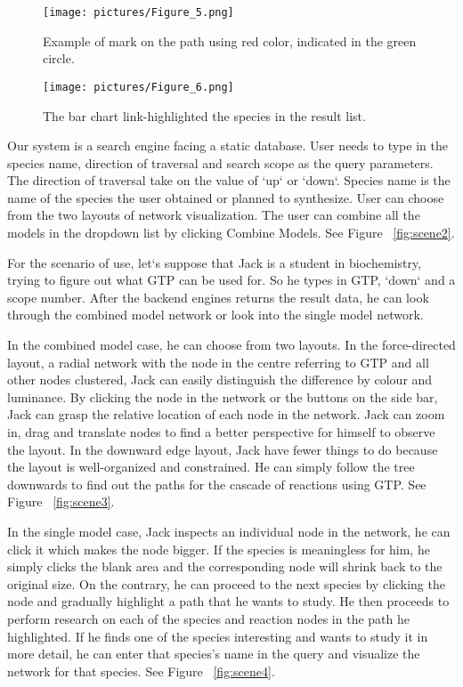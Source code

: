 \documentclass[journal]{vgtc}                %
\begin{document}
\begin{figure}
\texttt{[image: pictures/Figure\_5.png]}
\caption{Example of mark on the path using red color, indicated in the green circle. }
\label{fig:scene5}
\end{figure}

\begin{figure}
\texttt{[image: pictures/Figure\_6.png]}
\caption{The bar chart link-highlighted the species in the result list. }
\label{fig:scene6}
\end{figure}

Our system is a search engine facing a static database. User needs to type in the species name, direction of traversal and search scope as the query parameters. The direction of traversal  take on the value of `up` or `down`. Species name is the name of the species the user obtained or planned to synthesize. User can choose from the two layouts of network visualization. The user can combine all the models in the dropdown list by clicking Combine Models. See Figure ~\ref{fig:scene2}.


For the scenario of use, let`s suppose that Jack is a student in biochemistry, trying to figure out what GTP can be used for. So he types in GTP, `down` and a scope number. After the backend engines returns the result data, he can look through the combined model network or look into the single model network. 



In the combined model case, he can choose from two layouts. In the force-directed layout, a radial network with the node in the centre referring to GTP and all other nodes clustered, Jack can easily distinguish the difference by colour and luminance. By clicking the node in the network or the buttons on the side bar, Jack can grasp the relative location of each node in the network. Jack can zoom in, drag and translate nodes to find a better perspective for himself to observe the layout. In the downward edge layout, Jack have fewer things to do because the layout is well-organized and constrained. He can simply follow the tree downwards to find out the paths for the cascade of reactions using GTP. See Figure ~\ref{fig:scene3}.

In the single model case,  Jack inspects an individual node in the network, he can click it which makes the node bigger. If the species is meaningless for him, he simply clicks the blank area and the corresponding node will shrink back to the original size. On the contrary, he can proceed to the next species by clicking the node and gradually highlight a path that he wants to study. He then proceeds to perform research on each of the species and reaction nodes in the path he highlighted. If he finds one of the species interesting and wants to study it in more detail, he can enter that species’s name in the query and visualize the network for that species. See Figure ~\ref{fig:scene4}.
\end{document}
